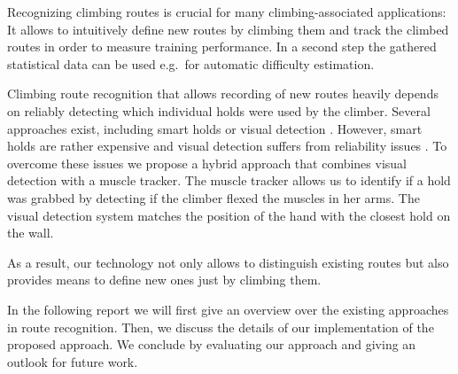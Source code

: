 Recognizing climbing routes is crucial for many climbing-associated applications:
It allows to intuitively define new routes by climbing them and track the climbed routes in order to measure training performance.
In a second step the gathered statistical data can be used e.g.\ for automatic difficulty estimation.

Climbing route recognition that allows recording of new routes heavily depends on reliably detecting which individual holds were used by the climber.
Several approaches exist, including smart holds \cite{Kistler:Online, Lechner:Online} or visual detection \cite{pub8245, Wiehr:2016:BET:2851581.2892393, Kajastila:2014:ACI:2611780.2581139, Kajastila:2014:ACI:2559206.2581139}.
However, smart holds are rather expensive and visual detection suffers from reliability issues \cite{pub8245, Wiehr:2016:BET:2851581.2892393, Kajastila:2014:ACI:2611780.2581139, Kajastila:2014:ACI:2559206.2581139}.
To overcome these issues we propose a hybrid approach that combines visual detection with a muscle tracker.
The muscle tracker allows us to identify if a hold was grabbed by detecting if the climber flexed the muscles in her arms.
The visual detection system matches the position of the hand with the closest hold on the wall.

As a result, our technology not only allows to distinguish existing routes but also provides means to define new ones just by climbing them.

In the following report we will first give an overview over the existing approaches in route recognition.
Then, we discuss the details of our implementation of the proposed approach.
We conclude by evaluating our approach and giving an outlook for future work.
